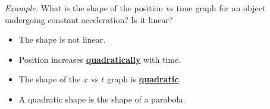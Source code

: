 \documentclass[14pt,t,dvipsnames]{beamer}
\begin{document}
\begin{frame}
\textit{Example.} What is the shape of the position vs time graph for an object undergoing constant acceleration? Is it linear?
\vspace{-1em}

\begin{minipage}[t]{4.2cm}
\vspace{0pt}%
\end{minipage}%
\pause
\begin{minipage}[t]{5.6cm}
\vspace{0pt}%
\small\color{red}
\begin{itemize}[<+->]
    \setlength{\leftmargini}{1.2em} %
    \setlength{\itemsep}{3pt}       %
    \item The shape is not linear.
    \item Position increases \textbf{\underline{quadratically}} with time.
    \item The shape of the $x$ vs $t$ graph is \textbf{\color{red}\underline{quadratic}}.
    \item A quadratic shape is the shape of a parabola.
\end{itemize}
\end{minipage}

\end{frame}
\end{document}
